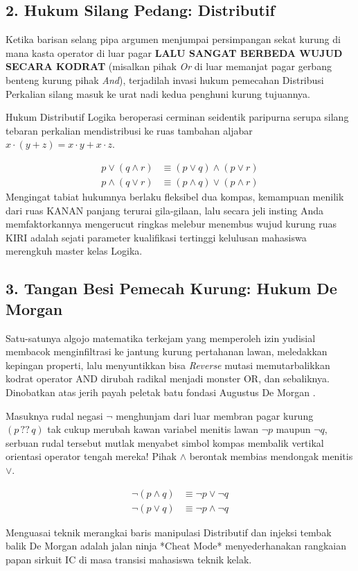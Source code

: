\subsection{2. Hukum Silang Pedang: Distributif}

Ketika barisan selang pipa argumen menjumpai persimpangan sekat kurung di mana kasta operator di luar pagar \textbf{LALU SANGAT BERBEDA WUJUD SECARA KODRAT} (misalkan pihak \textit{Or} di luar memanjat pagar gerbang benteng kurung pihak \textit{And}), terjadilah invasi hukum pemecahan Distribusi Perkalian silang masuk ke urat nadi kedua penghuni kurung tujuannya.

Hukum Distributif Logika beroperasi cerminan seidentik paripurna serupa silang tebaran perkalian mendistribusi ke ruas tambahan aljabar $x \cdot (y+z) = x\cdot y + x\cdot z$.

\begin{align*}
    p \vee (q \wedge r) &\equiv (p \vee q) \wedge (p \vee r) \\
    p \wedge (q \vee r) &\equiv (p \wedge q) \vee (p \wedge r) 
\end{align*}
Mengingat tabiat hukumnya berlaku fleksibel dua kompas, kemampuan menilik dari ruas KANAN panjang terurai gila-gilaan, lalu secara jeli insting Anda memfaktorkannya mengerucut ringkas melebur menembus wujud kurung ruas KIRI adalah sejati parameter kualifikasi tertinggi kelulusan mahasiswa merengkuh master kelas Logika.

\subsection{3. Tangan Besi Pemecah Kurung: Hukum De Morgan}

Satu-satunya algojo matematika terkejam yang memperoleh izin yudisial membacok menginfiltrasi ke jantung kurung pertahanan lawan, meledakkan kepingan properti, lalu menyuntikkan bisa \textit{Reverse} mutasi memutarbalikkan kodrat operator AND dirubah radikal menjadi monster OR, dan sebaliknya. Dinobatkan atas jerih payah peletak batu fondasi Augustus De Morgan \cite{wiki_first_order_logic}.

\begin{teorema}
Masuknya rudal negasi $\neg$ menghunjam dari luar membran pagar kurung $(p \,??\, q)$ tak cukup merubah kawan variabel menitis lawan $\neg p$ maupun $\neg q$, serbuan rudal tersebut mutlak menyabet simbol kompas membalik vertikal orientasi operator tengah mereka! Pihak $\land$ berontak membias mendongak menitis $\lor$.
\end{teorema}

\begin{align*}
    \neg(p \wedge q) &\equiv \neg p \vee \neg q \\
    \neg(p \vee q) &\equiv \neg p \wedge \neg q
\end{align*}

Menguasai teknik merangkai baris manipulasi Distributif dan injeksi tembak balik De Morgan adalah jalan ninja *Cheat Mode* menyederhanakan rangkaian papan sirkuit IC di masa transisi mahasiswa teknik kelak.
